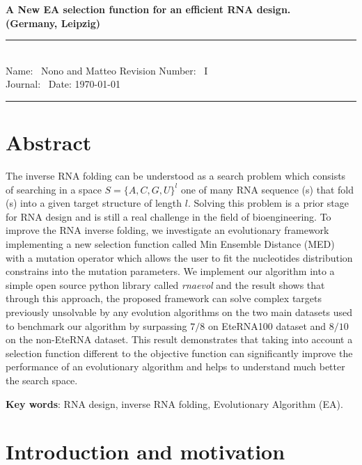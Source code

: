 \documentclass[english,12pt,a4paper]{article}
\theoremstyle{definition}
\begin{document}
	\begin{center}
		\textbf{A New EA selection function for an efficient RNA design.\\[0.5cm]
			(Germany, Leipzig)}
		\vspace{1.0cm}
	\end{center}
	
	\noindent
	\rule{17cm}{0.2cm}\\[0.3cm]
	Name: \ Nono and Matteo \hfill Revision Number: \ I \\[0.1cm]
	Journal: \ \hfill Date: \today\\
	\rule{17cm}{0.05cm}
	
	\section[I.]{Abstract}
	The inverse RNA folding can be understood as a search problem which consists of searching in a space $ S = \big \{A, C, G, U\big \}^l$ one of many RNA sequence (s) that fold (s) into a given target structure of length $l$.
	Solving this problem is a prior stage for RNA design and is still a real challenge in the field of bioengineering. To improve the RNA inverse folding, we investigate an evolutionary framework implementing a new selection function called Min Ensemble Distance (MED) with a mutation operator which allows the user to fit the nucleotides distribution constrains into the mutation parameters. We implement our algorithm into a simple open source python library called \textit{rnaevol} and the result shows that through this approach, the proposed framework can solve complex targets previously unsolvable by any evolution algorithms on the two main datasets used to benchmark our algorithm by surpassing $7/8$ on EteRNA100 dataset and $8/10$ on the non-EteRNA dataset. This result demonstrates that taking into account a selection function different to the objective function can significantly improve the performance of an evolutionary algorithm and helps to understand much better the search space.
	\vspace{1cm}
	
	\textbf{Key words}: RNA design, inverse RNA folding, Evolutionary Algorithm (EA).

	\section{ Introduction and motivation }
\end{document}
